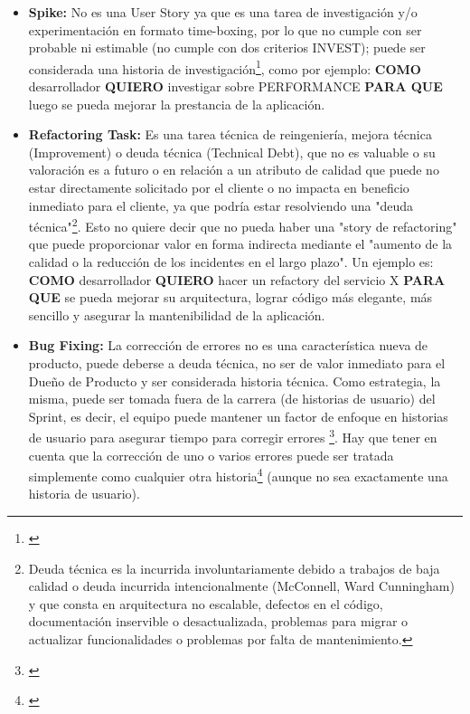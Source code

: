 \begin{itemize}
Para la Agile Alliance una Story no se corresponde en general a un "componente técnico" o de la "interfaz de usuario", pues a pesar de que a veces puede ser un atajo útil hablar de por ejemplo "la historia de diálogo de búsqueda", pantallas, cuadros de diálogo y botones, no son historias de usuario \footnote{\cite{Scrum-Alliance-2015}}.

\item \textbf{Spike:}
No es una User Story ya que es una tarea de investigación y/o experimentación en formato time-boxing, por lo que no cumple con ser probable ni estimable (no cumple con dos criterios INVEST); puede ser considerada una historia de investigación\footnote{\cite{Cohn-2004}}, como por ejemplo: \textbf{COMO} desarrollador \textbf{QUIERO} investigar sobre PERFORMANCE \textbf{PARA QUE} luego se pueda mejorar la prestancia de la aplicación.\newline

\item \textbf{Refactoring Task:}
Es una tarea técnica de reingeniería, mejora técnica (Improvement) o deuda técnica (Technical Debt), que no es valuable o su valoración es a futuro o en relación a un atributo de calidad que puede no estar directamente solicitado por el cliente o no impacta en beneficio inmediato para el cliente, ya que podría estar resolviendo una "deuda técnica"\footnote{Deuda técnica es la incurrida involuntariamente debido a trabajos de baja calidad o deuda incurrida intencionalmente (McConnell, Ward Cunningham) y que consta en arquitectura no escalable, defectos en el código, documentación inservible o desactualizada, problemas para migrar o actualizar funcionalidades o problemas por falta de mantenimiento.}. Esto no quiere decir que no pueda haber una "story de refactoring" que puede proporcionar valor en forma indirecta mediante el "aumento de la calidad o la reducción de los incidentes en el largo plazo".
Un ejemplo es: \textbf{COMO} desarrollador \textbf{QUIERO} hacer un refactory del servicio X \textbf{PARA QUE} se pueda mejorar su arquitectura, lograr código más elegante, más sencillo y asegurar la mantenibilidad de la aplicación.\newline

\item \textbf{Bug Fixing:} La corrección de errores no es una característica nueva de producto, puede deberse a deuda técnica, no ser de valor inmediato para el Dueño de Producto y ser considerada historia técnica. Como estrategia, la misma, puede ser tomada fuera de la carrera (de historias de usuario) del Sprint, es decir, el equipo puede mantener un factor de enfoque en historias de usuario para asegurar tiempo para corregir errores \footnote{\cite{Henrik-Kniberg-2007}}. Hay que tener en cuenta que la corrección de uno o varios errores puede ser tratada simplemente como cualquier otra historia\footnote{\cite{Cohn-2004}} (aunque no sea exactamente una historia de usuario).\newline

\end{itemize}

